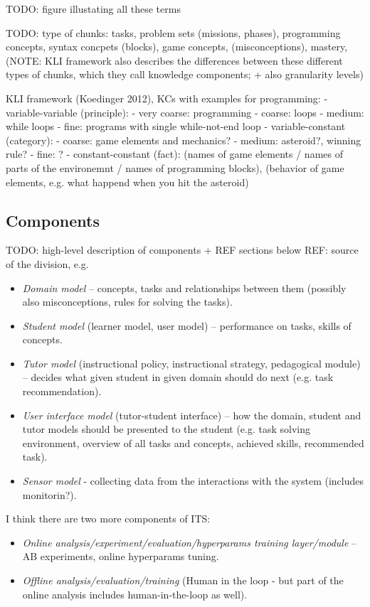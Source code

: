 TODO: figure illustating all these terms

TODO: type of chunks: tasks, problem sets (missions, phases), programming concepts,
  syntax concpets (blocks), game concepts, (misconceptions), mastery,
  (NOTE: KLI framework also describes the differences between these different types
  of chunks, which they call knowledge components; + also granularity levels)

KLI framework (Koedinger 2012), KCs with examples for programming:
- variable-variable (principle):
  - very coarse: programming
  - coarse: loops
  - medium: while loops
  - fine: programs with single while-not-end loop
- variable-constant (category):
  - coarse: game elements and mechanics?
  - medium: asteroid?, winning rule?
  - fine: ?
- constant-constant (fact):
  (names of game elements / names of parts of the environemnt / names of programming blocks),
  (behavior of game elements, e.g. what happend when you hit the asteroid)

\subsection{Components}

TODO: high-level description of components + REF sections below
REF: source of the division, e.g. \cite{its-learner-models}

\begin{itemize}
\item \emph{Domain model} -- concepts, tasks and relationships between them
    (possibly also misconceptions, rules for solving the tasks).
\item \emph{Student model} (learner model, user model) -- performance on tasks, skills of concepts.
\item \emph{Tutor model} (instructional policy, instructional strategy, pedagogical module) --
  decides what given student in given domain should do next (e.g. task recommendation).
\item \emph{User interface model} (tutor-student interface) -- how the domain, student and tutor models should be presented to the student (e.g. task solving environment, overview of all tasks and concepts, achieved skills, recommended task).
\item \emph{Sensor model} - collecting data from the interactions with the system
  (includes monitorin?).
\end{itemize}

I think there are two more components of ITS:
\begin{itemize}
\item \emph{Online analysis/experiment/evaluation/hyperparams training layer/module} -- AB experiments, online hyperparams tuning.
\item \emph{Offline analysis/evaluation/training} (Human in the loop - but part
  of the online analysis includes human-in-the-loop as well).
\end{itemize}

